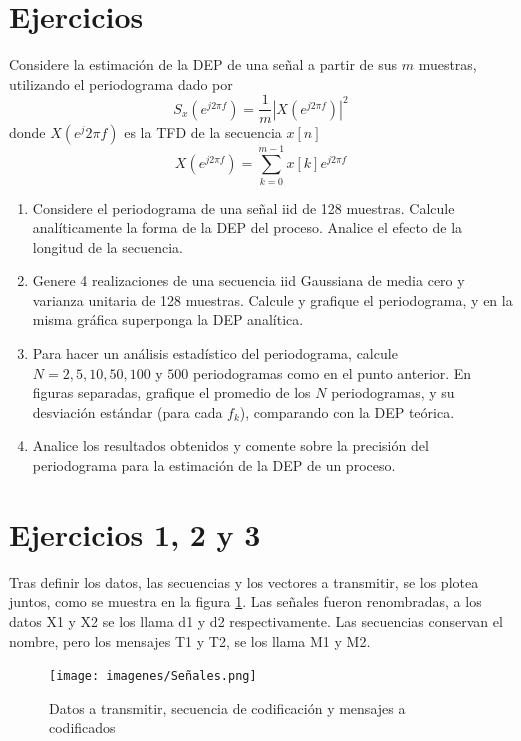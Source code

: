 \documentclass[12pt,letterpaper]{article}     %
\begin{document}
\newpage
\section{Ejercicios}
\begin{mdframed}
	Considere la estimación de la DEP de una señal a partir de sus $m$ muestras, utilizando el periodograma dado por
	\begin{equation*}
		S_x(e^{j2\pi f})=\frac{1}{m}|X(e^{j2\pi f})|^2
	\end{equation*}
	donde $X(e^j2\pi f)$ es la TFD de la secuencia $x[n]$
	\begin{equation*}
		X(e^{j2\pi f})=\sum_{k=0}^{m-1}x[k]e^{j2\pi f}
	\end{equation*}
\begin{enumerate}
	\item Considere el periodograma de una señal iid de 128 muestras.
		Calcule analíticamente la forma de la DEP
		del proceso. Analice el efecto de la longitud de la secuencia.
	\item Genere 4 realizaciones de una secuencia iid Gaussiana de media cero y varianza unitaria de 128 muestras.
		Calcule y grafique el periodograma, y en la misma gráfica superponga la DEP analítica.
	\item Para hacer un análisis estadístico del periodograma, calcule $N = 2, 5, 10, 50, 100$ y $500$ periodogramas como
		en el punto anterior. En figuras separadas, grafique el promedio de los $N$ periodogramas, y su desviación
		estándar (para cada $f_k$), comparando con la DEP teórica.
	\item Analice los resultados obtenidos y comente sobre la precisión del periodograma para la estimación de la
		DEP de un proceso.
\end{enumerate}
\end{mdframed}
%
\newpage
\section{Ejercicios 1, 2 y 3}
%
Tras definir los datos, las secuencias y los vectores a transmitir, se los plotea juntos,
como se muestra en la figura \ref{fig:datos}.
Las señales fueron renombradas, a los datos X1 y X2 se los llama d1 y d2 respectivamente.
Las secuencias conservan el nombre, pero los mensajes T1 y T2, se los llama M1 y M2.

\begin{figure}[!ht]
\centering
\texttt{[image: imagenes/Señales.png]}
\caption{Datos a transmitir, secuencia de codificación y mensajes a codificados}
\label{fig:datos}
\end{figure}
\end{document}
